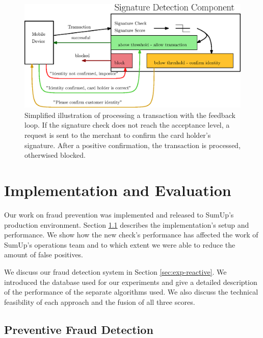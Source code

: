 \documentclass[a4paper, oneside]{csthesis}
\begin{document}
\begin{figure}[tb]
    \begin{center}
        \includegraphics[width=1\textwidth]{figures/fb-loop2.eps}
    \end{center}
    \caption{Simplified illustration of processing a transaction with the feedback loop. If the signature check does not reach the acceptance level, a request is sent to the merchant to confirm the card holder's signature. After a positive confirmation, the transaction is processed, otherwised blocked.}
    \label{fig:fb-loop2}
\end{figure}













\chapter{Implementation and Evaluation}
\label{chp:experiments}


Our work on fraud prevention was implemented and released to SumUp's production environment. Section \ref{sec:exp-preventive} describes the implementation's setup and performance. We show how the new check's performance has affected the work of SumUp's operations team and to which extent we were able to reduce the amount of false positives.

We discuss our fraud detection system in Section \ref{sec:exp-reactive}. We introduced the database used for our experiments and give a detailed description of the performance of the separate algorithms used. We also discuss the technical feasibility of each approach and the fusion of all three scores.


\section{Preventive Fraud Detection}
\label{sec:exp-preventive}
\end{document}
